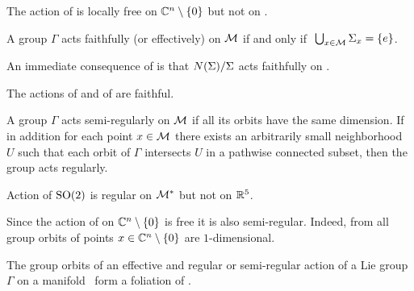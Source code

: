 \begin{example}
The action  of  is locally free on $\mathbb{C}^{n}\setminus\{0\}$ but not on .
\end{example}

\begin{definition}
\label{def:faithfull}
A group $\Gamma$ acts faithfully (or effectively) on $\mathcal{M}$ if and only if $\ \bigcup_{x\in\mathcal{M}}\Sigma_{x}=\{e\}$.
\end{definition}

An immediate consequence of 
is that $N(\Sigma)/\Sigma$ acts faithfully on \Fix{\Sigma}.


\begin{example}
 The actions  of  and  of  are faithful.
\end{example}

\begin{definition}
\label{def:regular}
A group $\Gamma$ acts semi-regularly on $\mathcal{M}$ if all its orbits have the same dimension.
If in addition for each point $x\in \mathcal{M}$
there exists an arbitrarily small neighborhood $U$ such that each orbit of $\Gamma$ intersects $U$ in a pathwise connected subset, then the group
acts regularly.
\end{definition}

\begin{example}
 Action  of $\mathrm{SO}(2)$ is regular on $\mathcal{M}^*$ but not on $\mathbb{R}^{5}$.
\end{example}


\begin{example}
Since the action  of  on $\mathbb{C}^{n}\setminus\{0\}$ is free it is also semi-regular. Indeed, from  all group orbits of points $x\in\mathbb{C}^{n}\setminus\{0\}$ are $1$-dimensional.
\end{example}

The group orbits of an effective and regular or semi-regular action of a Lie group $\Gamma$ on a manifold \Manif\ form a foliation of \Manif
{}.


